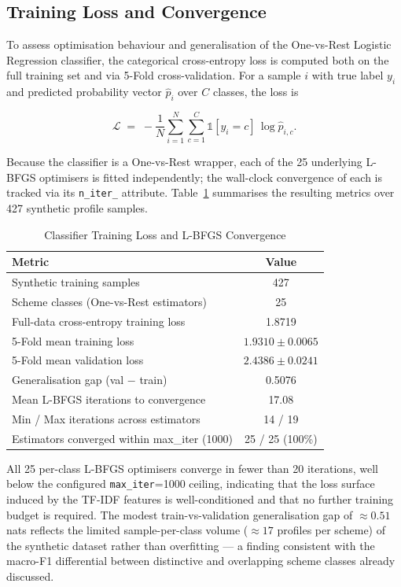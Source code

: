 \documentclass[10pt, journal, twocolumn]{IEEEtran}
\begin{document}
\subsection{Training Loss and Convergence}
To assess optimisation behaviour and generalisation of the One-vs-Rest Logistic Regression classifier, the categorical cross-entropy loss is computed both on the full training set and via 5-Fold cross-validation. For a sample $i$ with true label $y_i$ and predicted probability vector $\hat{p}_i$ over $C$ classes, the loss is

\begin{equation}
    \mathcal{L} \;=\; -\frac{1}{N}\sum_{i=1}^{N}\sum_{c=1}^{C} \mathbb{1}[y_i = c]\,\log \hat{p}_{i,c}.
\end{equation}

Because the classifier is a One-vs-Rest wrapper, each of the 25 underlying L-BFGS optimisers is fitted independently; the wall-clock convergence of each is tracked via its \texttt{n\_iter\_} attribute. Table~\ref{tab:training_loss} summarises the resulting metrics over 427 synthetic profile samples.

\begin{table}[htbp]
\centering
\caption{Classifier Training Loss and L-BFGS Convergence}
\label{tab:training_loss}
\begin{tabularx}{\linewidth}{@{}X c@{}}
\toprule
\textbf{Metric} & \textbf{Value} \\
\midrule
Synthetic training samples & 427 \\
Scheme classes (One-vs-Rest estimators) & 25 \\
\midrule
Full-data cross-entropy training loss & 1.8719 \\
5-Fold mean training loss & $1.9310 \pm 0.0065$ \\
5-Fold mean validation loss & $2.4386 \pm 0.0241$ \\
Generalisation gap (val $-$ train) & 0.5076 \\
\midrule
Mean L-BFGS iterations to convergence & 17.08 \\
Min / Max iterations across estimators & 14 / 19 \\
Estimators converged within max\_iter (1000) & 25 / 25 (100\%) \\
\bottomrule
\end{tabularx}
\end{table}

All 25 per-class L-BFGS optimisers converge in fewer than 20 iterations, well below the configured \texttt{max\_iter}=1000 ceiling, indicating that the loss surface induced by the TF-IDF features is well-conditioned and that no further training budget is required. The modest train-vs-validation generalisation gap of $\approx 0.51$ nats reflects the limited sample-per-class volume ($\approx 17$ profiles per scheme) of the synthetic dataset rather than overfitting --- a finding consistent with the macro-F1 differential between distinctive and overlapping scheme classes already discussed.
\end{document}
